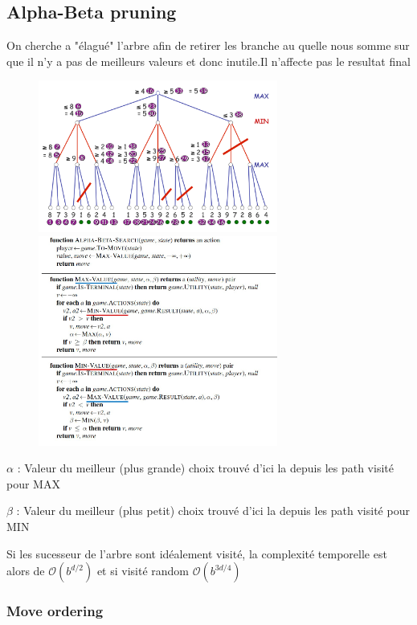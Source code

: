 	\subsection{Alpha-Beta pruning}
		On cherche a "élagué" l'arbre afin de retirer les branche au quelle nous somme sur que il n'y a pas de meilleurs valeurs et donc inutile.Il n'affecte pas le resultat final
		\begin{figure}[htp]
			\centering
			\includegraphics[width=0.7\textwidth]{img/alphabeta.png}
			\includegraphics[width=0.7\textwidth]{img/alphabetaalgo.png}
		\end{figure}
		
		$\alpha$ : Valeur du meilleur (plus grande) choix trouvé d'ici la depuis les path visité pour MAX
		
		$\beta$ : Valeur du meilleur (plus petit) choix trouvé d'ici la depuis les path visité pour MIN
		
		Si les sucesseur de l'arbre sont idéalement visité, la complexité temporelle est alors de $\mathcal{O}(b^{d/2})$ et si visité random $\mathcal{O}(b^{3d/4})$
		
		
		\subsubsection{Move ordering}
	
